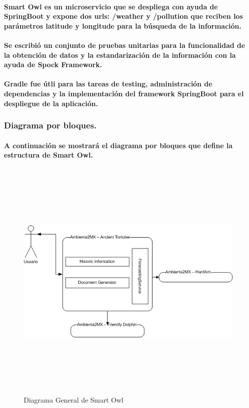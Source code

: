   \paragraph{Smart Owl es un microservicio que se despliega con ayuda de SpringBoot y expone dos urls: /weather y /pollution que reciben los parámetros \textbf{latitude} y \textbf{longitude} para la búsqueda de la información.}

  \paragraph{Se escribió un conjunto de pruebas unitarias para la funcionalidad de la obtención de datos y la estandarización de la información con la ayuda de Spock Framework.}
  \paragraph{Gradle fue útli para las tareas de testing, administración de dependencias y la implementación del framework SpringBoot para el despliegue de la aplicación.}

  \newpage
  \begin{landscape}
      \subsubsection{Diagrama por bloques.}
        \paragraph{A continuación se mostrará el diagrama por bloques que define la estructura de Smart Owl.}
        \begin{figure}[b!]
        \centering
        \includegraphics[width=22.5cm,height=12cm]{./images/DiagramaAncientTortoise.png}
        \caption{Diagrama General de Smart Owl}
      \end{figure}
      \end{landscape}
      \newpage
